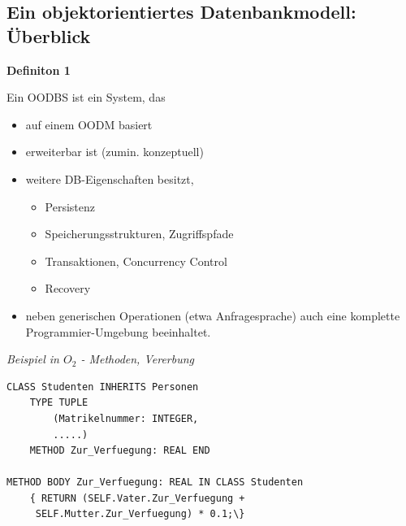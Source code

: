 \subsection{Ein objektorientiertes Datenbankmodell: Überblick}
\begin{framed}
	\textbf{Definiton 1}
\begin{description}
	\item Ein OODBS ist ein System, das
	\begin{itemize}
		\item auf einem OODM basiert
		\item erweiterbar ist (zumin. konzeptuell)
		\item weitere DB-Eigenschaften besitzt,
		\begin{itemize}
			\item Persistenz
			\item Speicherungsstrukturen, Zugriffspfade
			\item Transaktionen, Concurrency Control
			\item Recovery
		\end{itemize}
		\item neben generischen Operationen (etwa Anfragesprache) auch eine komplette Programmier-Umgebung beeinhaltet.
	\end{itemize}
\end{description} 
\end{framed}

\textit{Beispiel in $O_2$ - Methoden, Vererbung}
\begin{lstlisting}
CLASS Studenten INHERITS Personen
	TYPE TUPLE
		(Matrikelnummer: INTEGER,
		.....)
	METHOD Zur_Verfuegung: REAL END
	
METHOD BODY Zur_Verfuegung: REAL IN CLASS Studenten
	{ RETURN (SELF.Vater.Zur_Verfuegung +
	 SELF.Mutter.Zur_Verfuegung) * 0.1;\}
\end{lstlisting}

